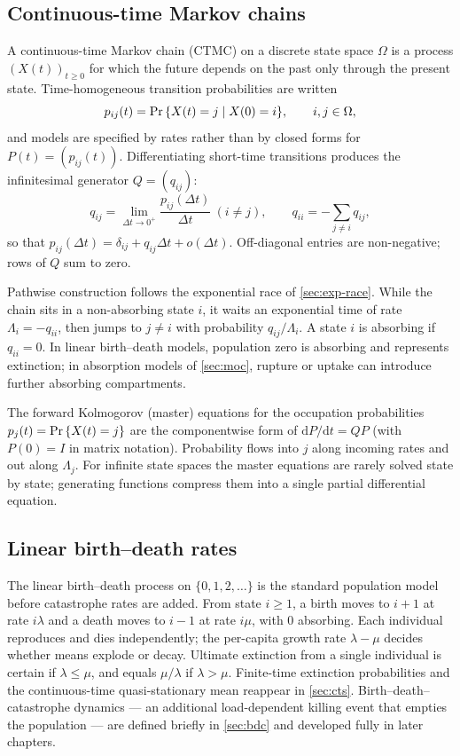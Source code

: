 \subsection{Continuous-time Markov chains}
\label{sec:ctmc}

A continuous-time Markov chain (CTMC) on a discrete state space $\Omega$ is a process
$(X(t))_{t\ge 0}$ for which the future depends on the past only through the present
state. Time-homogeneous transition probabilities are written
\begin{equation*}
p_{ij}(t)={\text{Pr}\left\{X(t)=j\mid X(0)=i\right\}},\qquad i,j\in\Omega,
\end{equation*}
and models are specified by rates rather than by closed forms for $P(t)=(p_{ij}(t))$.
Differentiating short-time transitions produces the infinitesimal generator $Q=(q_{ij})$:
\begin{equation}
\label{eq:generator}
q_{ij}=\lim_{\Delta t\to 0^+}\frac{p_{ij}(\Delta t)}{\Delta t}\ (i\neq j),\qquad
q_{ii}=-\sum_{j\neq i}q_{ij},
\end{equation}
so that $p_{ij}(\Delta t)=\delta_{ij}+q_{ij}\Delta t+o(\Delta t)$. Off-diagonal entries
are non-negative; rows of $Q$ sum to zero.

Pathwise construction follows the exponential race of \cref{sec:exp-race}. While the
chain sits in a non-absorbing state $i$, it waits an exponential time of rate
$\Lambda_i=-q_{ii}$, then jumps to $j\neq i$ with probability $q_{ij}/\Lambda_i$. A state
$i$ is absorbing if $q_{ii}=0$. In linear birth--death models, population zero is
absorbing and represents extinction; in absorption models of \cref{sec:moc}, rupture or
uptake can introduce further absorbing compartments.

The forward Kolmogorov (master) equations for the occupation probabilities
$p_j(t)={\text{Pr}\left\{X(t)=j\right\}}$ are the componentwise form of $\mathrm{d}P/\mathrm{d}t=QP$ (with
$P(0)=I$ in matrix notation). Probability flows into $j$ along incoming rates and out
along $\Lambda_j$. For infinite state spaces the master equations are rarely solved
state by state; generating functions compress them into a single partial differential
equation.

\subsection{Linear birth--death rates}
\label{sec:bd-linear-prelim}

The linear birth--death process on $\{0,1,2,\ldots\}$ is the standard population model
before catastrophe rates are added. From state $i\ge 1$, a birth moves to $i+1$ at rate
$i\lambda$ and a death moves to $i-1$ at rate $i\mu$, with $0$ absorbing. Each individual
reproduces and dies independently; the per-capita growth rate $\lambda-\mu$ decides
whether means explode or decay. Ultimate extinction from a single individual is certain
if $\lambda\le\mu$, and equals $\mu/\lambda$ if $\lambda>\mu$. Finite-time extinction
probabilities and the continuous-time quasi-stationary mean reappear in
\cref{sec:cts}. Birth--death--catastrophe dynamics --- an additional load-dependent
killing event that empties the population --- are defined briefly in \cref{sec:bdc} and
developed fully in later chapters.

